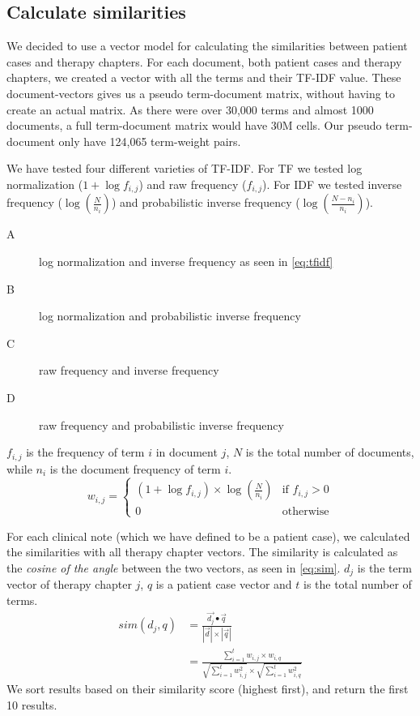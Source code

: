 \documentclass[a4paper, 11pt]{article}
\begin{document}
\subsection{Calculate similarities}
\label{sec:similarities}
We decided to use a vector model for calculating the similarities between
patient cases and therapy chapters. For each document, both patient cases
and therapy chapters, we created a vector with all the terms and their
TF-IDF value. These document-vectors gives us a pseudo term-document matrix,
without having to create an actual matrix. As there were over 30,000 terms
and almost 1000 documents, a full term-document matrix would have 30M cells.
Our pseudo term-document only have 124,065 term-weight pairs.

We have tested four different varieties of TF-IDF. For TF we tested log
normalization (\( 1 + \log f_{i,j} \)) and raw frequency (\( f_{i,j} \)).
For IDF we tested inverse frequency (\( \log(\frac{N}{n_{i}}) \)) and
probabilistic inverse frequency (\( \log(\frac{N - n_{i}}{n_{i}}) \)).
\begin{description}
	\item[A] log normalization and inverse frequency as seen in \autoref{eq:tfidf}
	\item[B] log normalization and probabilistic inverse frequency
	\item[C] raw frequency and inverse frequency 
	\item[D] raw frequency and probabilistic inverse frequency
\end{description}
\( f_{i,j} \) is the frequency of term \( i \) in document \( j \), \( N \)
is the total number of documents, while \( n_{i} \) is the document frequency
of term \( i \).
\begin{equation} \label{eq:tfidf}
	w_{i,j} =
	\begin{cases}
		(1 + \log f_{i,j}) \times \log(\frac{N}{n_{i}}) & \text{if } f_{i,j} > 0 \\
		0												& \text{otherwise}
	\end{cases}
\end{equation}

For each clinical note (which we have defined to be a patient case), we
calculated the similarities with all therapy chapter vectors. The similarity is
calculated as the \emph{cosine of the angle} between the two vectors, as seen
in \autoref{eq:sim}. \( d_{j} \) is the term vector of therapy chapter \( j \),
\( q \) is a patient case vector and \( t \) is the total number of terms.
\begin{align} \label{eq:sim}
	sim(d_{j}, q) &= \frac{\vec{d_{j}} \bullet \vec{q}}{|\vec{d}| \times |\vec{q}|} \nonumber \\
				  &= \frac{\sum_{i=1}^{t} w_{i,j} \times w_{i,q}}{\sqrt{\sum_{i=1}^{t} w_{i,j}^2} \times \sqrt{\sum_{i=1}^{t} w_{i,q}^2}}
\end{align}
We sort results based on their similarity score (highest first), and return
the first 10 results.
\end{document}
